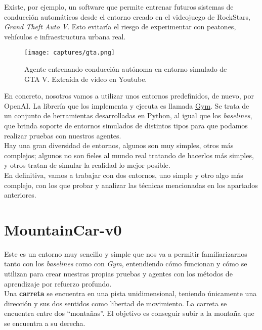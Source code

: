 \documentclass[11pt,fleqn]{book} %
\begin{document}
Existe, por ejemplo, un software que permite entrenar futuros sistemas de conducción automáticos desde el entorno creado en el videojuego de RockStars, \textit{Grand Theft Auto V}. Esto evitaría el riesgo de experimentar con peatones, vehículos e infraestructura urbana real. \\

\begin{figure}[H]
	\centering\texttt{[image: captures/gta.png]}
	\caption{Agente entrenando conducción autónoma en entorno simulado de GTA V. Extraída de vídeo en Youtube. \cite{article:gta}}
	\label{fig:gta} %
\end{figure}

En concreto, nosotros vamos a utilizar unos entornos predefinidos, de nuevo, por OpenAI. La librería que los implementa y ejecuta es llamada \href{https://gym.openai.com/}{Gym}. Se trata de un conjunto de herramientas desarrolladas en Python, al igual que los \textit{baselines}, que brinda soporte de entornos simulados de distintos tipos para que podamos realizar pruebas con nuestros agentes. \\

Hay una gran diversidad de entornos, algunos son muy simples, otros más complejos; algunos no son fieles al mundo real tratando de hacerlos más simples, y otros tratan de simular la realidad lo mejor posible. \\

En definitiva, vamos a trabajar con dos entornos, uno simple y otro algo más complejo, con los que probar y analizar las técnicas mencionadas en los apartados anteriores. \cite{article:gym} \cite{article:entornos}

\section{MountainCar-v0}\label{sec:mountaincar}

Este es un entorno muy sencillo y simple que nos va a permitir familiarizarnos tanto con los \textit{baselines} como con \textit{Gym}, entendiendo cómo funcionan y cómo se utilizan para crear nuestras propias pruebas y agentes con los métodos de aprendizaje por refuerzo profundo. \\

Una \textbf{carreta} se encuentra en una pista unidimensional, teniendo únicamente una dirección y sus dos sentidos como libertad de movimiento. La carreta se encuentra entre dos ``montañas''. El objetivo es conseguir subir a la montaña que se encuentra a su derecha. \\
\end{document}
